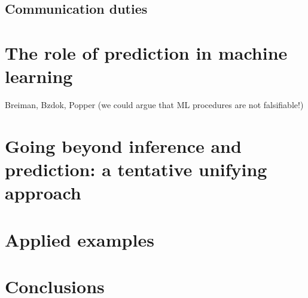 \documentclass{statsoc}
\begin{document}
\subsection{Communication duties}


\section{The role of prediction in machine learning}

\color{blue}

Breiman, Bzdok, Popper (we could argue that ML procedures are not falsifiable!)

\color{black}

\section{Going beyond inference and prediction: a tentative unifying approach}

\section{Applied examples}

\section{Conclusions}







\end{document}
